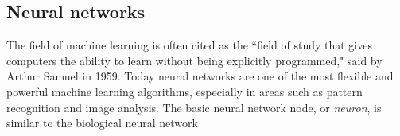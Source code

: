 \subsection{Neural networks}
The field of machine learning is often cited as the ``field of study that gives computers the ability to learn without being
explicitly programmed," said by Arthur Samuel in 1959. Today neural networks are one of the most flexible and powerful machine learning algorithms, especially in areas such as pattern recognition and image analysis. The basic neural network node, or \textit{neuron}, is similar to the biological neural network